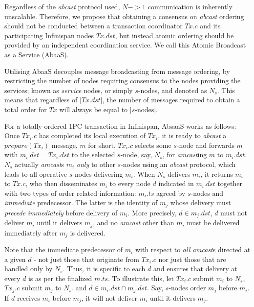 Regardless of the \emph{abcast} protocol used, $N->1$ communication is inherently unscalable.  Therefore, we propose that obtaining a consensus on \emph{abcast} ordering should not be conducted between a transaction coordinator $Tx.c$ and its participating Infinispan nodes $Tx.dst$, but instead atomic ordering should be provided by an independent coordination service.  We call this Atomic Broadcast as a Service (\textsf{AbaaS}).  

Utilising \textsf{AbaaS} decouples message broadcasting from message ordering, by restricting the number of nodes requiring consensus to the nodes providing the services; known as \emph{service} nodes, or simply $s$-nodes, and denoted as $N_s$.  This means that regardless of $\left\vert Tx.dst \right\vert$, the number of messages required to obtain a total order for $Tx$ will always be equal to $\left\vert s\text{-nodes}\right\vert$.  

For a totally ordered 1PC transaction in Infinispan, \textsf{AbsaaS} works as follows: Once $Tx_i.c$ has completed its local execution of $Tx_i$, it is ready to \emph{abcast} a $prepare(Tx_i)$ message, $m$ for short.  $Tx_i.c$ selects some $s$-node and forwards $m$ with $m_i.dst = Tx_i.dst$ to the selected $s$-node, say, $N_s$, for \emph{amcast}ing $m$ to $m_i.dst$. $N_s$ actually \emph{amcast}s $m_i$ \emph{only} to other $s$-nodes using an \emph{abcast} protocol, which leads to all operative $s$-nodes delivering $m_i$. When $N_s$ delivers $m_i$, it returns $m_i$ to $Tx.c$, who then disseminates $m_i$ to every node $d$ indicated in $m_i.dst$ together with two types of order related information: $m_i.ts$ agreed by $s$-nodes and \emph{immediate} predecessor. The latter is the identity of $m_j$ whose delivery must \emph{precede} \emph{immediately} before delivery of $m_i$. More precisely, $d \in m_j.dst$, $d$ must not deliver $m_i$ until it delivers $m_j$, and no \emph{amcast} other than $m_i$ must be delivered immediately after $m_j$ is delivered.

Note that the immediate predecessor of $m_i$ with respect to \emph{all} \emph{amcast}s directed at a given $d$ - not just those that originate from $Tx_i.c$ nor just those that are handled only by $N_s$. Thus, it is specific to each $d$ and ensures that delivery at every $d$ is as per the finalized $m.ts$. To illustrate this, let $Tx_i.c$ submit $m_i$ to $N_s$, $Tx_j.c$ submit $m_j$ to $N_{s'}$ and $d \in m_i.dst \cap m_j.dst $. Say, $s$-nodes order $m_j$ before $m_i$. If $d$ receives $m_i$ before $m_j$, it will not deliver $m_i$ until it delivers $m_j$.

